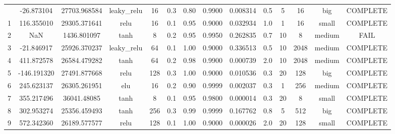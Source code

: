 \begin{longtable}{cccccccccccccc}
\bottomrule
\endlastfoot
                        0 &                 -26.873104 &                       27703.968584 &     leaky\_relu &          16 &         0.3 &        0.80 & 0.9900 &       0.008314 &             0.5 &         5 &       16 &       big & COMPLETE \\
                        1 &                 116.355010 &                       29305.371641 &            relu &          16 &         0.1 &        0.95 & 0.9000 &       0.032934 &             1.0 &         1 &       16 &     small & COMPLETE \\
                        2 &                        NaN &                        1436.801097 &            tanh &           8 &         0.2 &        0.95 & 0.9950 &       0.262835 &             0.7 &        10 &        8 &    medium &     FAIL \\
                        3 &                 -21.846917 &                       25926.370237 &     leaky\_relu &          64 &         0.1 &        1.00 & 0.9000 &       0.336513 &             0.5 &        10 &     2048 &    medium & COMPLETE \\
                        4 &                 411.872578 &                       26584.479282 &            tanh &          64 &         0.2 &        0.98 & 0.9900 &       0.000739 &             2.0 &        10 &     2048 &    medium & COMPLETE \\
                        5 &                -146.191320 &                       27491.877668 &            relu &         128 &         0.3 &        1.00 & 0.9000 &       0.010536 &             0.3 &        20 &      128 &       big & COMPLETE \\
                        6 &                 245.623137 &                       26305.261951 &             elu &          16 &         0.2 &        0.90 & 0.9999 &       0.002037 &             0.3 &         1 &      256 &    medium & COMPLETE \\
                        7 &                 355.217496 &                        36041.48085 &            tanh &           8 &         0.1 &        0.95 & 0.9800 &       0.000014 &             0.3 &        20 &        8 &     small & COMPLETE \\
                        8 &                 302.953274 &                       25356.459493 &            tanh &         256 &         0.3 &        0.99 & 0.9999 &       0.167762 &             0.8 &         5 &      512 &       big & COMPLETE \\
                        9 &                 572.342360 &                       26189.577577 &            relu &         128 &         0.1 &        1.00 & 0.9000 &       0.000026 &             2.0 &        20 &      128 &     small & COMPLETE \\

\end{longtable}
